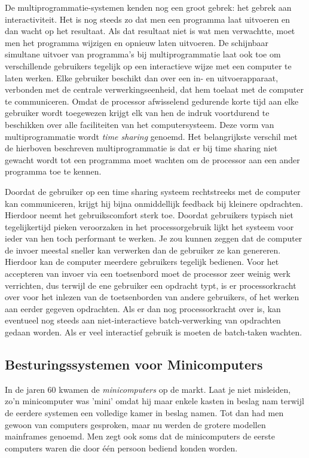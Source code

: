 De multiprogrammatie-systemen kenden nog een groot gebrek: het
gebrek aan interactiviteit. Het is nog steeds zo dat men een programma
laat uitvoeren en dan wacht op het resultaat. Als dat resultaat niet
is wat men verwachtte, moet men het programma wijzigen en opnieuw
laten uitvoeren. De schijnbaar simultane uitvoer van programma's bij
multiprogrammatie laat ook toe om verschillende gebruikers tegelijk op
een interactieve wijze met een computer te laten werken. Elke
gebruiker beschikt dan over een in- en uitvoerapparaat, verbonden met
de centrale verwerkingseenheid, dat hem toelaat met de computer te
communiceren. Omdat de processor afwisselend gedurende korte tijd aan
elke gebruiker wordt toegewezen krijgt elk van hen de indruk
voortdurend te beschikken over alle faciliteiten van het
computersysteem. Deze vorm van multiprogrammatie wordt \emph{time
sharing} genoemd. Het belangrijkste verschil met de
hierboven beschreven multiprogrammatie is dat er bij time sharing niet
gewacht wordt tot een programma moet wachten om de processor aan een
ander programma toe te kennen.

Doordat de gebruiker op een time sharing systeem rechtstreeks
met de computer kan communiceren, krijgt hij bijna onmiddellijk
feedback bij kleinere opdrachten. Hierdoor neemt het gebruikscomfort
sterk toe. Doordat gebruikers typisch niet tegelijkertijd pieken
veroorzaken in het processorgebruik lijkt het systeem voor ieder van
hen toch performant te werken. Je zou kunnen zeggen dat de computer de
invoer meestal sneller kan verwerken dan de gebruiker ze kan
genereren. Hierdoor kan de computer meerdere gebruikers tegelijk
bedienen. Voor het accepteren van invoer via een toetsenbord moet de
processor zeer weinig werk verrichten, dus terwijl de ene gebruiker
een opdracht typt, is er processorkracht over voor het inlezen van de
toetsenborden van andere gebruikers, of het werken aan eerder gegeven
opdrachten. Als er dan nog processorkracht over is, kan eventueel nog
steeds aan niet-interactieve batch-verwerking van opdrachten gedaan
worden. Als er veel interactief gebruik is moeten de batch-taken
wachten.

\subsection{Besturingssystemen voor Minicomputers}

In de jaren 60 kwamen de \emph{minicomputers} op
de markt. Laat je niet misleiden, zo'n minicomputer was 'mini' omdat
hij maar enkele kasten in beslag nam terwijl de eerdere systemen een
volledige kamer in beslag namen. Tot dan had men gewoon van computers
gesproken, maar nu werden de grotere modellen mainframes genoemd. Men
zegt ook soms dat de minicomputers de eerste computers waren die door
\'e\'en persoon bediend konden worden.

